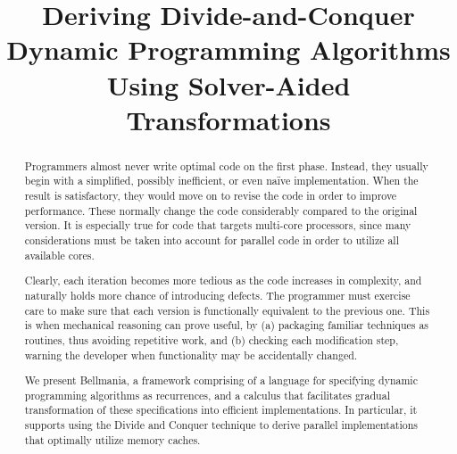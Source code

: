 \documentclass[preprint]{sigplanconf}
\begin{document}
\setlength{\pdfpageheight}{\paperheight}
\setlength{\pdfpagewidth}{\paperwidth}



\title{Deriving Divide-and-Conquer Dynamic Programming Algorithms Using 
  Solver-Aided Transformations}

           {}
           {}

\maketitle

\begin{abstract}
Programmers almost never write optimal code on the first phase.
Instead, they usually begin with a simplified, possibly inefficient, or even
na\"ive implementation. When the result is satisfactory, they would move
on to revise the code in order to improve performance. These normally
change the code considerably compared to the original version. It is especially
true for code that targets multi-core processors, since many considerations
must be taken into account for parallel code in order to utilize all available
cores.

Clearly, each iteration becomes more tedious as the code increases in complexity,
and naturally holds more chance of introducing defects. The programmer must
exercise care to make sure that each version is functionally equivalent to the
previous one. This is when mechanical reasoning can prove useful, by 
(a) packaging familiar techniques as routines, thus avoiding repetitive work, and
(b) checking each modification step, warning the developer when functionality
may be accidentally changed.

We present Bellmania, a framework comprising of a language for specifying
dynamic programming algorithms as recurrences,
and a calculus that facilitates gradual transformation of these 
specifications into efficient implementations.
In particular, it supports using the Divide and Conquer technique to derive
parallel implementations that optimally utilize memory caches.
\end{abstract}
\end{document}

